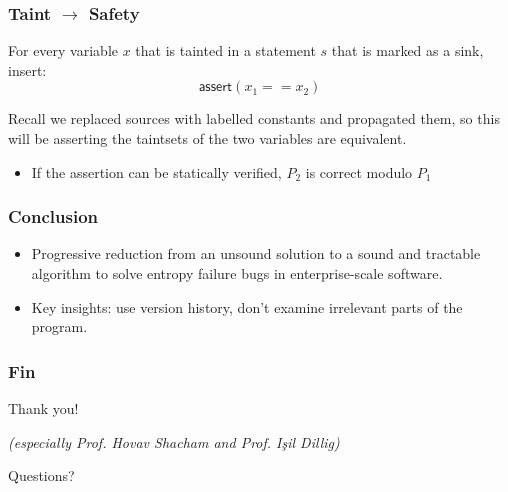 \documentclass{beamer} %
\theoremstyle{definition} %
\begin{document}
\begin{frame}
\frametitle{Taint $\to$ Safety}
	
	For every variable $x$ that is tainted in a statement $s$ that is marked as a sink, insert: \[\textsf{assert}(x_1 == x_2)\]

    Recall we replaced sources with labelled constants and propagated them, so this will be asserting the taintsets of the two variables are equivalent.
    
    \pause

    \begin{itemize}
        \item If the assertion can be statically verified, $P_2$ is correct modulo $P_1$
    \end{itemize}
	

\end{frame}

\begin{frame}
    \frametitle{Conclusion}

    \begin{itemize}
        \item Progressive reduction from an unsound solution to a sound and tractable algorithm to solve entropy failure bugs in enterprise-scale software.
        \item Key insights: use version history, don't examine irrelevant parts of the program.
    \end{itemize}
\end{frame}

\begin{frame}
    \frametitle{Fin}
    \begin{center}
    Thank you! 

    \emph{\scriptsize{(especially Prof. Hovav Shacham and Prof. Işil Dillig)}}
    
    \LARGE{Questions?}
    
    \end{center}
\end{frame}




\end{document}
